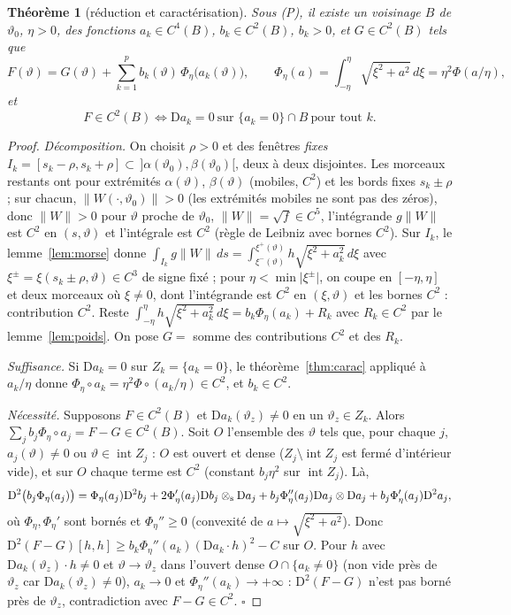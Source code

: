 \documentclass[11pt,a4paper]{article}
\newtheorem{theoreme}{Théorème}
\theoremstyle{remark}
\newcommand{\vth}{\vartheta}
\newcommand{\D}{\mathrm D}
\begin{document}
\begin{theoreme}[réduction et caractérisation]\label{thm:R}
Sous (P), il existe un voisinage $B$ de $\vth_0$, $\eta>0$, des fonctions $a_k\in C^4(B)$, $b_k\in C^2(B)$, $b_k>0$, et $G\in C^2(B)$ tels que
\[
F(\vth)=G(\vth)+\sum_{k=1}^pb_k(\vth)\,\Phi_\eta\bigl(a_k(\vth)\bigr),\qquad\Phi_\eta(a)=\int_{-\eta}^{\eta}\sqrt{\xi^2+a^2}\,d\xi=\eta^2\Phi(a/\eta),
\]
et
\[
\boxed{\ F\in C^2(B)\iff\D a_k=0\ \text{sur }\{a_k=0\}\cap B\ \text{pour tout }k.\ }
\]
\end{theoreme}
\begin{proof}
\emph{Décomposition.} On choisit $\rho>0$ et des fenêtres \emph{fixes} $I_k=[s_k-\rho,s_k+\rho]\subset\,]\alpha(\vth_0),\beta(\vth_0)[$, deux à deux disjointes. Les morceaux restants ont pour extrémités $\alpha(\vth)$, $\beta(\vth)$ (mobiles, $C^2$) et les bords fixes $s_k\pm\rho$ ; sur chacun, $\lVert W(\cdot,\vth_0)\rVert>0$ (les extrémités mobiles ne sont pas des zéros), donc $\lVert W\rVert>0$ pour $\vth$ proche de $\vth_0$, $\lVert W\rVert=\sqrt f\in C^5$, l'intégrande $g\lVert W\rVert$ est $C^2$ en $(s,\vth)$ et l'intégrale est $C^2$ (règle de Leibniz avec bornes $C^2$). Sur $I_k$, le lemme~\ref{lem:morse} donne $\int_{I_k}g\lVert W\rVert\,ds=\int_{\xi^-(\vth)}^{\xi^+(\vth)}h\sqrt{\xi^2+a_k^2}\,d\xi$ avec $\xi^\pm=\xi(s_k\pm\rho,\vth)\in C^3$ de signe fixé ; pour $\eta<\min\lvert\xi^\pm\rvert$, on coupe en $[-\eta,\eta]$ et deux morceaux où $\xi\ne0$, dont l'intégrande est $C^2$ en $(\xi,\vth)$ et les bornes $C^2$ : contribution $C^2$. Reste $\int_{-\eta}^\eta h\sqrt{\xi^2+a_k^2}\,d\xi=b_k\Phi_\eta(a_k)+R_k$ avec $R_k\in C^2$ par le lemme~\ref{lem:poids}. On pose $G=$ somme des contributions $C^2$ et des $R_k$.

\emph{Suffisance.} Si $\D a_k=0$ sur $Z_k=\{a_k=0\}$, le théorème~\ref{thm:carac} appliqué à $a_k/\eta$ donne $\Phi_\eta\circ a_k=\eta^2\Phi\circ(a_k/\eta)\in C^2$, et $b_k\in C^2$.

\emph{Nécessité.} Supposons $F\in C^2(B)$ et $\D a_k(\vth_z)\ne0$ en un $\vth_z\in Z_k$. Alors $\sum_jb_j\Phi_\eta\circ a_j=F-G\in C^2(B)$. Soit $O$ l'ensemble des $\vth$ tels que, pour chaque $j$, $a_j(\vth)\ne0$ ou $\vth\in\operatorname{int}Z_j$ : $O$ est ouvert et dense ($Z_j\setminus\operatorname{int}Z_j$ est fermé d'intérieur vide), et sur $O$ chaque terme est $C^2$ (constant $b_j\eta^2$ sur $\operatorname{int}Z_j$). Là,
\[
\D^2\bigl(b_j\Phi_\eta(a_j)\bigr)=\Phi_\eta(a_j)\D^2b_j+2\Phi_\eta'(a_j)\D b_j\otimes_{\rm s}\D a_j+b_j\Phi_\eta''(a_j)\D a_j\otimes\D a_j+b_j\Phi_\eta'(a_j)\D^2a_j ,
\]
où $\Phi_\eta,\Phi_\eta'$ sont bornés et $\Phi_\eta''\ge0$ (convexité de $a\mapsto\sqrt{\xi^2+a^2}$). Donc $\D^2(F-G)[h,h]\ge b_k\Phi_\eta''(a_k)(\D a_k\cdot h)^2-C$ sur $O$. Pour $h$ avec $\D a_k(\vth_z)\cdot h\ne0$ et $\vth\to\vth_z$ dans l'ouvert dense $O\cap\{a_k\ne0\}$ (non vide près de $\vth_z$ car $\D a_k(\vth_z)\ne0$), $a_k\to0$ et $\Phi_\eta''(a_k)\to+\infty$ : $\D^2(F-G)$ n'est pas borné près de $\vth_z$, contradiction avec $F-G\in C^2$. $\square$
\end{proof}
\end{document}
